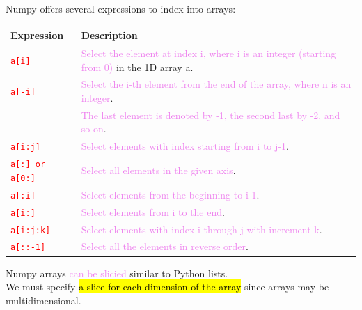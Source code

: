 \documentclass{book}
\begin{document}
Numpy offers several expressions to index into arrays:
\begin{center}
    \begin{tabular}{|m{3cm}|m{12.5cm}|}
        \hline
        \rowcolor{lightblue}
            \textbf{Expression} & \textbf{Description} \\
            \hline
            \textcolor{red}{\texttt{a[i]}} & \textcolor{violet}{Select the element at index i, where i is an integer (starting from 0)} in the 1D array a. \\
            \hline
            \textcolor{red}{\texttt{a[-i]}} & \textcolor{violet}{Select the i-th element from the end of the array, where n is an integer}. \\
            & \textcolor{violet}{The last element is denoted by -1, the second last by -2, and so on}. \\
            \hline
            \textcolor{red}{\texttt{a[i:j]}} & \textcolor{violet}{Select elements with index starting from i to j-1}. \\
            \hline
            \textcolor{red}{\texttt{a[:] or a[0:]}} & \textcolor{violet}{Select all elements in the given axis}. \\
            \hline
            \textcolor{red}{\texttt{a[:i]}} & \textcolor{violet}{Select elements from the beginning to i-1}. \\
            \hline
            \textcolor{red}{\texttt{a[i:]}} & \textcolor{violet}{Select elements from i to the end}. \\
            \hline
            \textcolor{red}{\texttt{a[i:j:k]}} & \textcolor{violet}{Select elements with index i through j with increment k}. \\
            \hline
            \textcolor{red}{\texttt{a[::-1]}} & \textcolor{violet}{Select all the elements in reverse order}. \\
            \hline
    \end{tabular}
\end{center}
\newpage
Numpy arrays \textcolor{violet}{can be slicied} similar to Python lists.\\
We must specify \hl{a slice for each dimension of the array} since arrays may be multidimensional.
\end{document}
